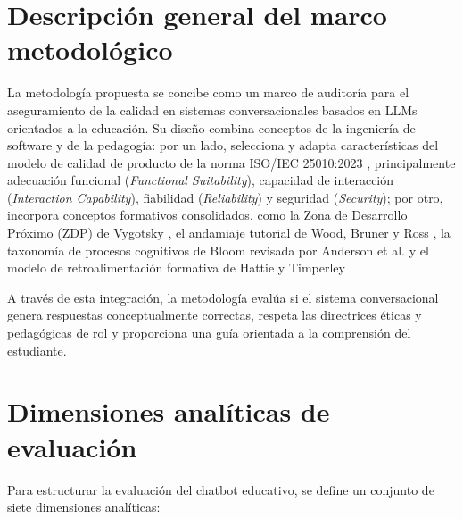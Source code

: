 \section{Descripción general del marco metodológico}
\label{sec:descripcion_metodologia}
La metodología propuesta se concibe como un marco de auditoría para el aseguramiento de la calidad en sistemas conversacionales basados en LLMs orientados a la educación. Su diseño combina conceptos de la ingeniería de software y de la pedagogía: por un lado, selecciona y adapta características del modelo de calidad de producto de la norma ISO/IEC 25010:2023 \cite{iso25010}, principalmente adecuación funcional (\textit{Functional Suitability}), capacidad de interacción (\textit{Interaction Capability}), fiabilidad (\textit{Reliability}) y seguridad (\textit{Security}); por otro, incorpora conceptos formativos consolidados, como la Zona de Desarrollo Próximo (ZDP) de Vygotsky \cite{vygotsky1978mind}, el andamiaje tutorial de Wood, Bruner y Ross \cite{wood1976role}, la taxonomía de procesos cognitivos de Bloom revisada por Anderson et al. \cite{bloom1956taxonomy, anderson2001taxonomy} y el modelo de retroalimentación formativa de Hattie y Timperley \cite{hattie2007power}.

A través de esta integración, la metodología evalúa si el sistema conversacional genera respuestas conceptualmente correctas, respeta las directrices éticas y pedagógicas de rol y proporciona una guía orientada a la comprensión del estudiante.

\section{Dimensiones analíticas de evaluación}
\label{sec:dimensiones_evaluacion}
Para estructurar la evaluación del chatbot educativo, se define un conjunto de siete dimensiones analíticas:

